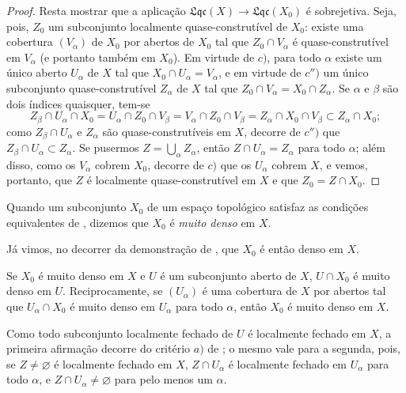 \begin{proof}
Resta mostrar que a aplicação $\mathfrak{Lqc}(X)\to\mathfrak{Lqc}(X_0)$ é sobrejetiva.
Seja, pois, $Z_0$ um subconjunto localmente quase-construtível de $X_0$: existe uma cobertura $(V_\alpha)$ de $X_0$ por abertos de $X_0$ tal que $Z_0\cap V_\alpha$ é quase-construtível em $V_\alpha$ (e
portanto também em $X_0$).
Em virtude de $c)$, para todo $\alpha$ existe um único aberto $U_\alpha$ de $X$ tal que $X_0\cap U_\alpha=V_\alpha$, e em virtude de $c'')$ um único subconjunto quase-construtível $Z_\alpha$ de $X$ tal que $Z_0\cap V_\alpha=X_0\cap Z_\alpha$.
Se $\alpha$ e $\beta$ são dois índices quaisquer, tem-se
\[
Z_\beta\cap U_\alpha\cap X_0
=U_\alpha\cap Z_0\cap V_\beta
=V_\alpha\cap Z_0\cap V_\beta
=Z_\alpha\cap X_0\cap V_\beta
\subset Z_\alpha\cap X_0;
\]
como $Z_\beta\cap U_\alpha$ e $Z_\alpha$ são quase-construtíveis em $X$, decorre de $c'')$ que $Z_\beta\cap U_\alpha\subset Z_\alpha$.
Se pusermos $Z=\bigcup_\alpha Z_\alpha$, então $Z\cap U_\alpha=Z_\alpha$ para todo $\alpha$; além disso, como os $V_\alpha$ cobrem $X_0$, decorre de $c)$ que os $U_\alpha$ cobrem $X$, e vemos, portanto, que $Z$ é localmente quase-construtível em $X$ e que $Z_0=Z\cap X_0$.
\end{proof}

\begin{definition}[10.1.3]
\label{IV.10.1.3}
Quando um subconjunto $X_0$ de um espaço topológico satisfaz as condições equivalentes de , dizemos que $X_0$ é \emph{muito denso} em $X$.
\end{definition}

Já vimos, no decorrer da demonstração de , que $X_0$ é então denso em $X$.

\begin{corollary}[10.1.4]
\label{IV.10.1.4}
Se $X_0$ é muito denso em $X$ e $U$ é um subconjunto aberto de $X$, $U\cap X_0$ é muito denso em $U$.
Reciprocamente, se $(U_\alpha)$ é uma cobertura de $X$ por abertos tal que $U_\alpha\cap X_0$ é muito denso em $U_\alpha$ para todo $\alpha$, então $X_0$ é muito denso em $X$.
\end{corollary}

Como todo subconjunto localmente fechado de $U$ é localmente fechado em $X$, a primeira afirmação decorre do critério $a)$ de ; o mesmo vale para a segunda, pois, se $Z\neq\varnothing$ é localmente fechado em $X$, $Z\cap U_\alpha$ é localmente fechado em $U_\alpha$ para todo $\alpha$, e $Z\cap U_\alpha\neq\varnothing$ para pelo menos um $\alpha$.

